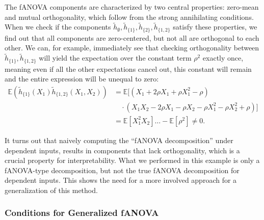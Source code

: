 The fANOVA components are characterized by two central properties: zero-mean and mutual orthogonality, which follow from the strong annihilating conditions.
When we check if the components $\tilde{h}_{\emptyset}, \tilde{h}_{\{1\}}, \tilde{h}_{\{2\}}, \tilde{h}_{\{1,2\}}$ satisfy these properties, we find out that all components are zero-centered, but not all are orthogonal to each other. We can, for example, immediately see that checking orthogonality between $\tilde{h}_{\{1\}}, \tilde{h}_{\{1,2\}}$ will yield the expectation over the constant term $\rho^2$ exactly once, meaning even if all the other expectations cancel out, this constant will remain and the entire expression will be unequal to zero:
\begin{align*}
    \mathbb{E}(\tilde{h}_{\{1\}}(X_1)\tilde{h}_{\{1,2\}}(X_1, X_2)) 
    &= \mathbb{E}[(X_1 + 2\rho X_1 + \rho X_1^2 - \rho) \\
    &\quad \cdot (X_1 X_2 - 2\rho X_1 - \rho X_2 - \rho X_1^2 - \rho X_2^2 + \rho)] \\
    &= \mathbb{E}[X_{1}^2X_2] \ldots - \mathbb{E}[\rho^2] \neq 0.
\end{align*}

It turns out that naively computing the ``fANOVA decomposition'' under dependent inputs, results in components that lack orthogonality, which is a crucial property for interpretability.
What we performed in this example is only a fANOVA-type decomposition, but not the true fANOVA decomposition for dependent inputs.
This shows the need for a more involved approach for a generalization of this method.

\subsubsection{Conditions for Generalized fANOVA}

